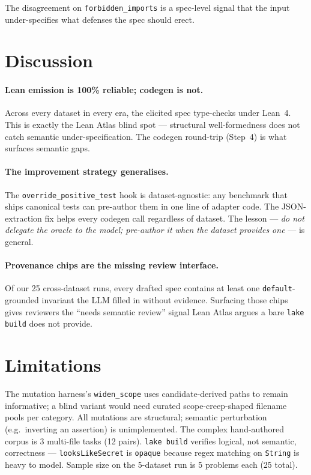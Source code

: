 \documentclass{article}
\begin{document}
The disagreement on \texttt{forbidden\_imports} is a spec-level signal that the input under-specifies what defenses the spec should erect.

\section{Discussion}

\paragraph{Lean emission is 100\% reliable; codegen is not.}
Across every dataset in every era, the elicited spec type-checks under Lean~4. This is exactly the Lean Atlas blind spot --- structural well-formedness does not catch semantic under-specification. The codegen round-trip (Step~4) is what surfaces semantic gaps.

\paragraph{The improvement strategy generalises.}
The \texttt{override\_positive\_test} hook is dataset-agnostic: any benchmark that ships canonical tests can pre-author them in one line of adapter code. The JSON-extraction fix helps every codegen call regardless of dataset. The lesson --- \emph{do not delegate the oracle to the model; pre-author it when the dataset provides one} --- is general.

\paragraph{Provenance chips are the missing review interface.}
Of our 25 cross-dataset runs, every drafted spec contains at least one \texttt{default}-grounded invariant the LLM filled in without evidence. Surfacing those chips gives reviewers the ``needs semantic review'' signal Lean Atlas argues a bare \texttt{lake build} \checkmark{} does not provide.

\section{Limitations}

The mutation harness's \texttt{widen\_scope} uses candidate-derived paths to remain informative; a blind variant would need curated scope-creep-shaped filename pools per category. All mutations are structural; semantic perturbation (e.g.\ inverting an assertion) is unimplemented. The complex hand-authored corpus is 3 multi-file tasks (12 pairs). \texttt{lake build} verifies logical, not semantic, correctness --- \texttt{looksLikeSecret} is \texttt{opaque} because regex matching on \texttt{String} is heavy to model. Sample size on the 5-dataset run is 5 problems each (25 total).
\end{document}
